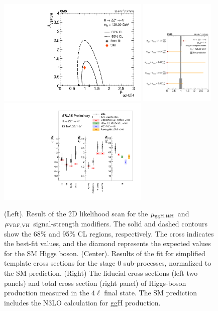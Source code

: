 \documentclass[10pt]{article}
\begin{document}
\begin{figure}[htb]
\centering
\includegraphics[height=2in]{figures/CMS-HIG-16-041_Figure_008-c.pdf}
\includegraphics[height=2in]{figures/CMS-HIG-16-041_Figure_009.pdf}
\includegraphics[height=2in]{figures/ATLAS-HIGG-2016-25__fig_07__xs.pdf}
\caption{
  (Left). Result of the 2D likelihood scan for the ${\rm \mu_{ggH,ttH}}$
  and ${\rm \mu_{VBF,VH}}$ signal-strength modifiers. The solid and dashed
  contours show the 68\% and 95\% CL regions, respectively. The cross
  indicates the best-fit values, and the diamond represents the expected
  values for the SM Higgs boson.
  (Center). Results of the fit for simplified template cross sections for
  the stage 0 sub-processes, normalized to the SM prediction.
  (Right) The fiducial cross sections (left two panels) and total cross
  section (right panel) of Higgs-boson production measured in the $4\ell$
  final state. The SM prediction includes the N3LO calculation for ggH
  production.
}
\label{fig:figure-ZZ-2}
\end{figure}
\end{document}
